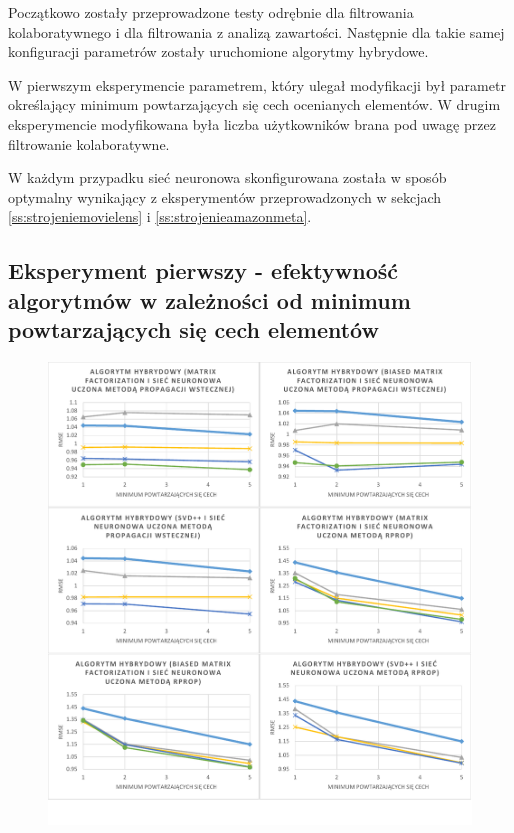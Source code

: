\documentclass[twoside]{iisthesis}
\begin{document}
		Początkowo zostały przeprowadzone testy odrębnie dla filtrowania kolaboratywnego i dla filtrowania z analizą zawartości. Następnie dla takie samej konfiguracji parametrów zostały uruchomione algorytmy hybrydowe. 
		
		W pierwszym eksperymencie parametrem, który ulegał modyfikacji był parametr określający minimum powtarzających się cech ocenianych elementów. W drugim eksperymencie modyfikowana była liczba użytkowników brana pod uwagę przez filtrowanie kolaboratywne. 
		
		W każdym przypadku sieć neuronowa skonfigurowana została w sposób optymalny wynikający z eksperymentów przeprowadzonych w sekcjach \ref{ss:strojeniemovielens} i \ref{ss:strojenieamazonmeta}.
		
		\subsection{Eksperyment pierwszy - efektywność algorytmów w zależności od minimum powtarzających się cech elementów}
		
		
		\begin{figure}[!ht]
			\centering
			\includegraphics[page=1,width=1\textwidth]{exphybrid_movielens1}
			\label{fig:exphybrid_movielens1a}
		\end{figure}
		
\end{document}
